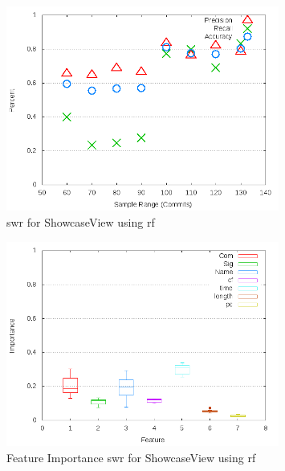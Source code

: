 \begin{figure}[!t]
\centering
\includegraphics[width=0.8\textwidth]{images/rf/test_1/ShowcaseView_sample_range.png}
\caption{\gls{swr} for ShowcaseView using \gls{rf}}
\label{fig:test_1_ShowcaseView_rf}
\end{figure}

\begin{figure}[!t]
\centering
\includegraphics[width=0.8\textwidth]{images/rf/test_1/ShowcaseView_importance.png}
\caption{Feature Importance \gls{swr} for ShowcaseView using \gls{rf}}
\label{fig:test_1_ShowcaseView_rf_importance}
\end{figure}

